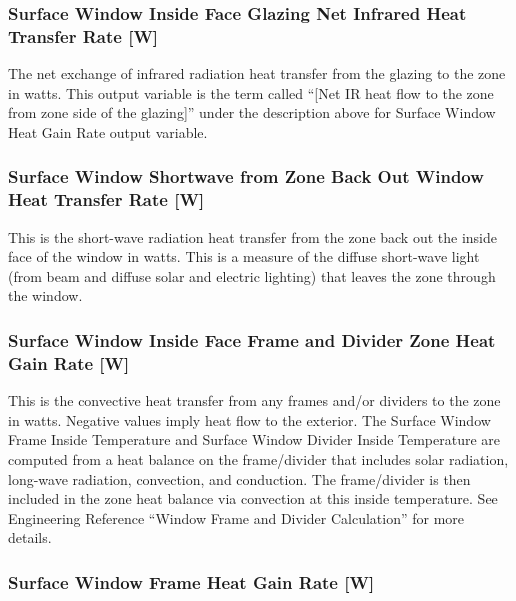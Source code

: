 \subsubsection{Surface Window Inside Face Glazing Net Infrared Heat Transfer Rate {[}W{]}}\label{surface-window-inside-face-glazing-net-infrared-heat-transfer-rate-w}

The net exchange of infrared radiation heat transfer from the glazing to the zone in watts. This output variable is the term called ``{[}Net IR heat flow to the zone from zone side of the glazing{]}'' under the description above for Surface Window Heat Gain Rate output variable.

\subsubsection{Surface Window Shortwave from Zone Back Out Window Heat Transfer Rate {[}W{]}}\label{surface-window-shortwave-from-zone-back-out-window-heat-transfer-rate-w}

This is the short-wave radiation heat transfer from the zone back out the inside face of the window in watts. This is a measure of the diffuse short-wave light (from beam and diffuse solar and electric lighting) that leaves the zone through the window.

\subsubsection{Surface Window Inside Face Frame and Divider Zone Heat Gain Rate {[}W{]}}\label{surface-window-inside-face-frame-and-divider-zone-heat-gain-rate-w}

This is the convective heat transfer from any frames and/or dividers to the zone in watts. Negative values imply heat flow to the exterior. The Surface Window Frame Inside Temperature and Surface Window Divider Inside Temperature are computed from a heat balance on the frame/divider that includes solar radiation, long-wave radiation, convection, and conduction. The frame/divider is then included in the zone heat balance via convection at this inside temperature. See Engineering Reference ``Window Frame and Divider Calculation'' for more details.

\subsubsection{Surface Window Frame Heat Gain Rate {[}W{]}}\label{surface-window-frame-heat-gain-rate-w}

